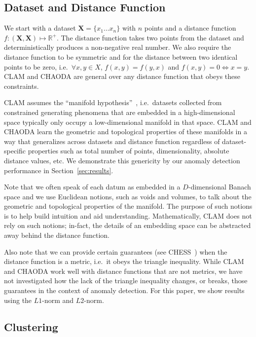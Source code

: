 \subsection{Dataset and Distance Function}
\label{subsec:methods:dataset-and-distance-function}

We start with a dataset $\textbf{X} = \{x_1 \dots x_n\}$ with $n$ points and a distance function $f : (\textbf{X}, \textbf{X}) \mapsto \mathbb{R}^+$.
The distance function takes two points from the dataset and deterministically produces a non-negative real number.
We also require the distance function to be symmetric and for the distance between two identical points to be zero, i.e.\ $\forall x, y \in X$, $f(x, y) = f(y, x)$ and $f(x, y) = 0 \Leftrightarrow x = y$.
CLAM and CHAODA are general over any distance function that obeys these constraints.

CLAM assumes the ``manifold hypothesis''~\cite{fefferman2016testing}, i.e.\ datasets collected from constrained generating phenomena that are embedded in a high-dimensional space typically only occupy a low-dimensional manifold in that space.
CLAM and CHAODA learn the geometric and topological properties of these manifolds in a way that generalizes across datasets and distance function regardless of dataset-specific properties such as total number of points, dimensionality, absolute distance values, etc.
We demonstrate this genericity by our anomaly detection performance in Section~\ref{sec:results}.

Note that we often speak of each datum as embedded in a $D$-dimensional Banach space and we use Euclidean notions, such as voids and volumes, to talk about the geometric and topological properties of the manifold.
The purpose of such notions is to help build intuition and aid understanding.
Mathematically, CLAM does not rely on such notions; in-fact, the details of an embedding space can be abstracted away behind the distance function.

Also note that we can provide certain guarantees (see CHESS~\cite{ishaq2019clustered}) when the distance function is a metric, i.e.\ it obeys the triangle inequality.
While CLAM and CHAODA work well with distance functions that are not metrics, we have not investigated how the lack of the triangle inequality changes, or breaks, those guarantees in the context of anomaly detection.
For this paper, we show results using the $L1$-norm and $L2$-norm.


\subsection{Clustering}
\label{subsec:methods:clustering}

